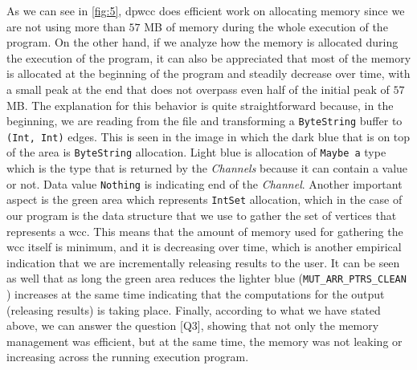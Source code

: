 As we can see in \autoref{fig:5}, \acrshort{dpwcc} does efficient work on allocating memory since we are not using more than $57$ MB of memory during the whole execution of the program.
On the other hand, if we analyze how the memory is allocated during the execution of the program, it can also be appreciated that most of the memory is allocated at the beginning of the program and steadily decrease over time, with a small peak at the end that does not overpass even half of the initial peak of $57$ MB. 
The explanation for this behavior is quite straightforward because, in the beginning, we are reading from the file and transforming a \texttt{ByteString} buffer to \texttt{(Int, Int)} edges. 
This is seen in the image in which the dark blue that is on top of the area is \texttt{ByteString} allocation. 
Light blue is allocation of \texttt{Maybe a} type which is the type that is returned by the \textit{Channels} because it can contain a value or not. 
Data value \texttt{Nothing} is indicating end of the \textit{Channel}. 
Another important aspect is the green area which represents \texttt{IntSet} allocation, which in the case of our program is the data structure that we use to gather the set of vertices that represents a \acrshort{wcc}. 
This means that the amount of memory used for gathering the \acrshort{wcc} itself is minimum, and it is decreasing over time, which is another empirical indication that we are incrementally releasing results to the user. 
It can be seen as well that as long the green area reduces the lighter blue (\texttt{MUT_ARR_PTRS_CLEAN} \cite{ghcheap}) increases at the same time indicating that the computations for the output (releasing results) is taking place. 
Finally, according to what we have stated above, we can answer the question [Q3], showing that not only the memory management was efficient, but at the same time, the memory was not leaking or increasing across the running execution program.

